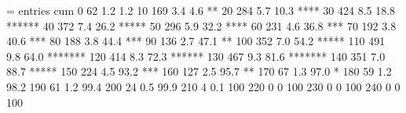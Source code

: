 \documentclass[letterpaper,10pt,english]{sphinxmanual}
\begin{document}
\begin{sphinxVerbatim}[commandchars=\\\{\}]
           \PYGZlt{}=       entries     \PYGZpc{}  cum\PYGZpc{}
        0            62       1.2   1.2 \textbar{}
       10           169       3.4   4.6 ** \textbar{}
       20           284       5.7  10.3 ****    \textbar{}
       30           424       8.5  18.8 ******         \textbar{}
       40           372       7.4  26.2 *****               \textbar{}
       50           296       5.9  32.2 ****                     \textbar{}
       60           231       4.6  36.8 ***                          \textbar{}
       70           192       3.8  40.6 ***                             \textbar{}
       80           188       3.8  44.4 ***                                \textbar{}
       90           136       2.7  47.1 **                                   \textbar{}
      100           352       7.0  54.2 *****                                      \textbar{}
      110           491       9.8  64.0 *******                                            \textbar{}
      120           414       8.3  72.3 ******                                                   \textbar{}
      130           467       9.3  81.6 *******                                                          \textbar{}
      140           351       7.0  88.7 *****                                                                 \textbar{}
      150           224       4.5  93.2 ***                                                                       \textbar{}
      160           127       2.5  95.7 **                                                                          \textbar{}
      170            67       1.3  97.0 *                                                                            \textbar{}
      180            59       1.2  98.2                                                                               \textbar{}
      190            61       1.2  99.4                                                                                \textbar{}
      200            24       0.5  99.9                                                                                \textbar{}
      210             4       0.1 100                                                                                   \textbar{}
      220             0       0   100                                                                                   \textbar{}
      230             0       0   100                                                                                   \textbar{}
      240             0       0   100                                                                                   \textbar{}

\end{sphinxVerbatim}
\end{document}
